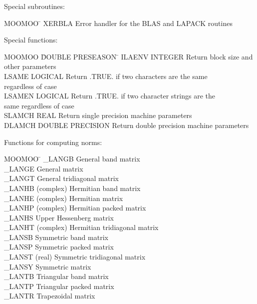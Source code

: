 \vspace{11pt}
\noindent
Special subroutines:
\begin{tabbing}
MOOMOO \= \kill
XERBLA \>  Error handler for the BLAS and LAPACK routines
\end{tabbing}

\noindent
Special functions:
\begin{tabbing}
MOOMOO \= DOUBLE PRESEASON \= \kill
ILAENV \> INTEGER \> Return block size and other parameters \\
LSAME  \> LOGICAL \> Return .TRUE. if two characters are the same \\
       \>         \> regardless of case \\
LSAMEN \> LOGICAL \> Return .TRUE. if two character strings are the \\
       \>         \> same regardless of case \\
SLAMCH \> REAL \> Return single precision machine parameters \\
DLAMCH \> DOUBLE PRECISION \> Return double precision machine parameters
\end{tabbing}

\noindent
Functions for computing norms:
\begin{tabbing}
MOOMOO \= \kill
\_LANGB \> General band matrix \\
\_LANGE \> General matrix \\
\_LANGT \> General tridiagonal matrix \\
\_LANHB \> (complex) Hermitian band matrix \\
\_LANHE \> (complex) Hermitian matrix \\
\_LANHP \> (complex) Hermitian packed matrix \\
\_LANHS \> Upper Hessenberg matrix \\
\_LANHT \> (complex) Hermitian tridiagonal matrix \\
\_LANSB \> Symmetric band matrix \\
\_LANSP \> Symmetric packed matrix \\
\_LANST \> (real) Symmetric tridiagonal matrix \\
\_LANSY \> Symmetric matrix \\
\_LANTB \> Triangular band matrix \\
\_LANTP \> Triangular packed matrix \\
\_LANTR \> Trapezoidal matrix 
\end{tabbing}

